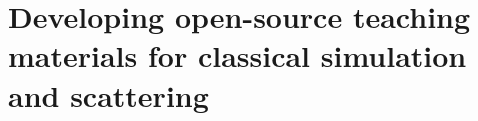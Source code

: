 
\chapter{Developing open-source teaching materials for classical simulation and scattering} %

\label{teaching} %





\pagebreak






